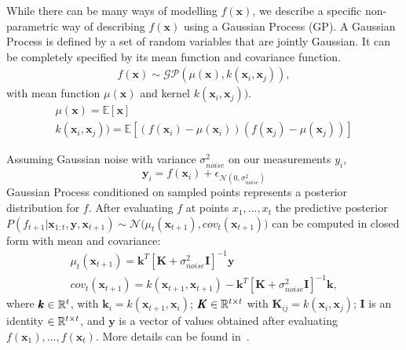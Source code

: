 While there can be many ways of modelling $f(\pmb{x})$, we describe a specific non-parametric way of describing $f(\pmb{x})$ using a Gaussian Process (GP). A Gaussian Process is defined by a set of random variables that are jointly Gaussian. It can be completely specified by its mean function and covariance function. 
\begin{align}
f(\pmb{x}) \sim \mathcal{GP}(\mu(\pmb{x}), k(\pmb{x}_i, \pmb{x}_j)),
\end{align}
with mean function $\mu(\pmb{x})$ and kernel $k(\pmb{x}_i, \pmb{x}_j))$. 
\begin{align}
   \mu(\pmb{x}) = \mathds{E}[\pmb{x}] \\
   k(\pmb{x}_i, \pmb{x}_j)) = \mathds{E}[(f(\pmb{x}_i)-\mu(\pmb{x}_i))(f(\pmb{x}_j)-\mu(\pmb{x}_j))]
\end{align}

Assuming Gaussian noise with variance $\sigma^2_{noise}$ on our measurements $y_i$, 
\begin{equation}
    \pmb{y}_i = f(\pmb{x}_i) + \epsilon_{\mathcal{N}(0, \sigma^2_{noise})}
\end{equation}
Gaussian Process conditioned on sampled points represents a posterior distribution for $f$. After evaluating $f$ at points $x_1,...,x_t$ the predictive posterior $P(f_{t+1} | \pmb{x}_{1:t}, \pmb{y}, \pmb{x}_{t+1}) \sim \mathcal{N}\big(\mu_t(\pmb{x}_{t+1}), cov_t(\pmb{x}_{t+1})\big)$ can be computed in closed form with mean and covariance:
\begin{align}
\mu_t(\pmb{x}_{t+1}) = \pmb{k}^T [\pmb{K} + \sigma^2_{noise} \pmb{I}]^{-1} \pmb{y} \quad \quad \quad \\
cov_t(\pmb{x}_{t+1}) = k(\pmb{x}_{t+1}, \pmb{x}_{t+1}) - \pmb{k}^T [\pmb{K} + \sigma^2_{noise} \pmb{I}]^{-1} \pmb{k},
\end{align}
where $\pmb{k} \in \mathbb R^t$, with $\pmb{k}_i=k(\pmb{x}_{t+1}, \pmb{x}_i)$; $\pmb{K} \in \mathbb R^{t \times t}$ with $\pmb{K}_{ij} = k(\pmb{x}_i, \pmb{x}_j)$; $\pmb{I}$ is an identity $\in \mathbb R^{t \times t}$, and $\pmb{y}$ is a vector of values obtained after evaluating $f(\pmb{x}_1), ..., f(\pmb{x}_t)$. More details can be found in~\cite{GPsMLBook}.

